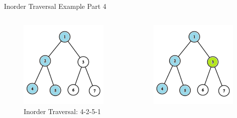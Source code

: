 \documentclass[aspectratio=169]{beamer}%
\begin{document}
\begin{frame}{Inorder Traversal Example Part 4}
    \begin{columns}
        \begin{column}{0.32\textwidth}
            \begin{figure}
                \centering
                \includegraphics[width = .9\linewidth]{tree-in 10.png}
                \caption{Inorder Traversal: 4-2-5-1}
            \end{figure}
        \end{column}
        \hfill
        \begin{column}{0.32\textwidth}
            \begin{figure}
                \centering
                \includegraphics[width = .9\linewidth]{tree-in 11.png}

\end{figure}
\end{column}
\end{columns}
\end{frame}
\end{document}
